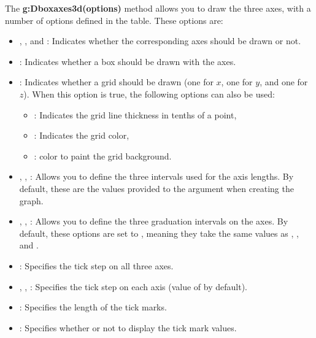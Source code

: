 The \textbf{g:Dboxaxes3d(options)} method allows you to draw the three axes, with a number of options defined in the  table. These options are:
\begin{itemize}
    \item {}, , and : Indicates whether the corresponding axes should be drawn or not.

    \item {}: Indicates whether a box should be drawn with the axes.

    \item {}: Indicates whether a grid should be drawn (one for $x$, one for $y$, and one for $z$). When this option is true, the following options can also be used:
\begin{itemize}
    \item {}: Indicates the grid line thickness in tenths of a point,
    \item {}: Indicates the grid color,
    \item {}: color to paint the grid background.
\end{itemize}

    \item {}, , : Allows you to define the three intervals used for the axis lengths. By default, these are the values ​​provided to the  argument when creating the graph.

    \item {}, , : Allows you to define the three graduation intervals on the axes. By default, these options are set to , meaning they take the same values ​​as , , and .

    \item {}: Specifies the tick step on all three axes.

    \item {}, , : Specifies the tick step on each axis (value of  by default).

    \item {}: Specifies the length of the tick marks.

    \item {}: Specifies whether or not to display the tick mark values.


\end{itemize}
